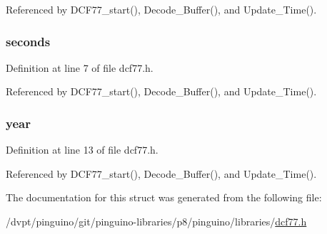 Referenced by D\-C\-F77\-\_\-start(), Decode\-\_\-\-Buffer(), and Update\-\_\-\-Time().

\hypertarget{struct_time___date___format_ae53e173daf8fcf970bb3324ae545f21c}{
\subsubsection[{seconds}]{ seconds}}\label{struct_time___date___format_ae53e173daf8fcf970bb3324ae545f21c}


Definition at line 7 of file dcf77.\-h.



Referenced by D\-C\-F77\-\_\-start(), Decode\-\_\-\-Buffer(), and Update\-\_\-\-Time().

\hypertarget{struct_time___date___format_ab02bacda75d48acac498f0c9f4e9b1cf}{
\subsubsection[{year}]{ year}}\label{struct_time___date___format_ab02bacda75d48acac498f0c9f4e9b1cf}


Definition at line 13 of file dcf77.\-h.



Referenced by D\-C\-F77\-\_\-start(), Decode\-\_\-\-Buffer(), and Update\-\_\-\-Time().



The documentation for this struct was generated from the following file\-:\begin{DoxyCompactItemize}
\item 
/dvpt/pinguino/git/pinguino-\/libraries/p8/pinguino/libraries/\hyperlink{p8_2pinguino_2libraries_2dcf77_8h}{dcf77.\-h}\end{DoxyCompactItemize}
